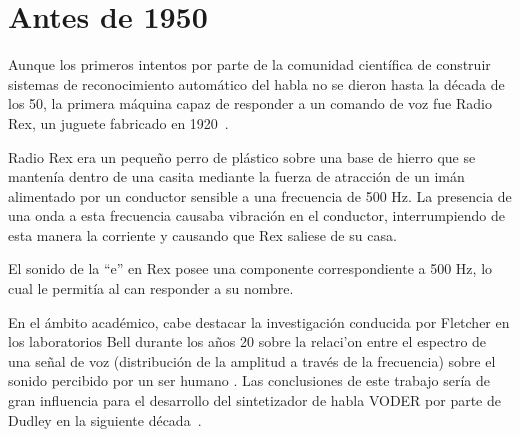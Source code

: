 \section{Antes de 1950}
\label{sec:pre50s}

Aunque los primeros intentos por parte de la comunidad cient\'{i}fica de construir sistemas de reconocimiento autom\'{a}tico del habla no se dieron hasta la d\'{e}cada de los 50, la primera m\'{aquina} capaz de responder
a un comando de voz fue Radio Rex, un juguete fabricado en \mbox{1920 \cite{AnusuyaSpeech2009}}.

Radio Rex era un peque\~{n}o perro de pl\'{a}stico sobre una base de hierro que se manten\'{i}a dentro de una casita
mediante la fuerza de atracci\'{o}n de un im\'{a}n alimentado por un conductor sensible a una frecuencia de 500 Hz.
La presencia de una onda a esta frecuencia causaba vibraci\'{o}n en el conductor, interrumpiendo de
esta manera la corriente y causando que Rex saliese de su casa. 

El sonido de la ``e'' en Rex posee una componente correspondiente a 500 Hz, lo cual le permit\'{i}a al can responder a su nombre.

En el \'{a}mbito acad\'{e}mico, cabe destacar la investigaci\'{o}n conducida por Fletcher en los laboratorios Bell
durante los a\~{n}os 20 sobre la relaci'{o}n entre el espectro de una se\~{n}al de voz (distribuci\'{o}n de 
la amplitud a trav\'{e}s de la frecuencia) sobre el sonido percibido por un ser humano \cite{FletcherNature1922}. 
Las conclusiones de este trabajo ser\'{i}a de gran influencia para el desarrollo del sintetizador de habla VODER por parte de Dudley en la siguiente \mbox{d\'{e}cada \cite{JuangAutomaticSpeech}}. 